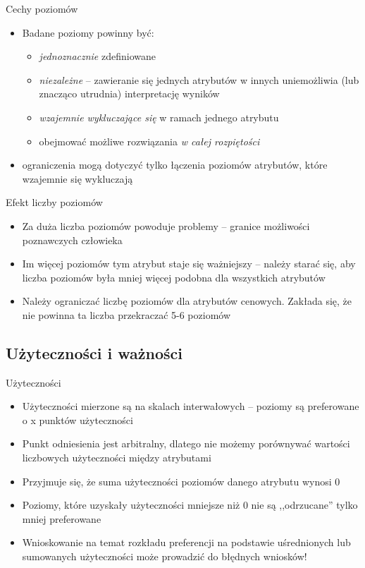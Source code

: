 \documentclass{beamer}
\begin{document}
\begin{frame}{Cechy poziomów}
  \begin{itemize}
  \item Badane poziomy powinny być:
    \begin{itemize}
    \item \emph{jednoznacznie} zdefiniowane
    \item \emph{niezależne} -- zawieranie się jednych atrybutów w innych uniemożliwia (lub znacząco utrudnia) interpretację wyników
    \item \emph{wzajemnie wykluczające się} w ramach jednego atrybutu
    \item obejmować możliwe rozwiązania \emph{w całej rozpiętości}
    \end{itemize}
  \item ograniczenia mogą dotyczyć tylko łączenia poziomów atrybutów, które wzajemnie się wykluczają
  \end{itemize}
\end{frame}

\begin{frame}{Efekt liczby poziomów}
  \begin{itemize}
  \item Za duża liczba poziomów powoduje problemy -- granice możliwości poznawczych człowieka
  \item Im więcej poziomów tym atrybut staje się ważniejszy -- należy starać się, aby liczba poziomów była mniej więcej podobna dla wszystkich atrybutów
  \item Należy ograniczać liczbę poziomów dla atrybutów cenowych. Zakłada się, że nie powinna ta liczba przekraczać 5-6 poziomów
  \end{itemize}
\end{frame}

\subsection{Użyteczności i ważności}

\begin{frame}{Użyteczności}
  \begin{itemize}
  \item Użyteczności mierzone są na skalach interwałowych -- poziomy są preferowane o x punktów użyteczności
  \item Punkt odniesienia jest arbitralny, dlatego nie możemy porównywać wartości liczbowych użyteczności między atrybutami
  \item Przyjmuje się, że suma użyteczności poziomów danego atrybutu wynosi 0
  \item Poziomy, które uzyskały użyteczności mniejsze niż 0 nie są ,,odrzucane'' tylko mniej preferowane
  \item Wnioskowanie na temat rozkładu preferencji na podstawie uśrednionych lub sumowanych użyteczności może prowadzić do błędnych wniosków!
  \end{itemize}
\end{frame}
\end{document}
